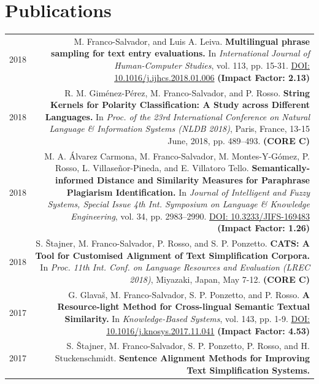 \documentclass[10pt]{article}
\begin{document}
\section*{Publications}
\begin{tabular}{L!{\VRule}R}
	2018 & M. Franco-Salvador, and Luis A. Leiva. \textbf{Multilingual phrase sampling for text entry evaluations.}
	In \emph{International Journal of Human-Computer Studies}, vol. 113, pp. 15-31. \href{https://doi.org/10.1016/j.ijhcs.2018.01.006}{DOI: 10.1016/j.ijhcs.2018.01.006} \textbf{(Impact Factor: 2.13)} \vspace{5pt}\\	
	2018& R. M. Gim{\'e}nez-P{\'e}rez, M. Franco-Salvador, and P. Rosso. \textbf{String Kernels for Polarity Classification: A Study across Different Languages.}
	In \emph{Proc. of the 23rd International Conference on Natural Language \& Information Systems (NLDB 2018)}, Paris, France, 13-15 June, 2018, pp. 489--493. \textbf{(CORE C)}\vspace{5pt}\\
	2018&M. A. {\'A}lvarez Carmona,  M. Franco-Salvador, M. Montes-Y-G{\'o}mez, P. Rosso, L. Villase{\~n}or-Pineda, and E. Villatoro Tello. \textbf{Semantically-informed Distance and Similarity Measures for Paraphrase Plagiarism Identification.}
	In \emph{Journal of Intelligent and Fuzzy Systems, Special Issue 4th Int. Symposium on Language \& Knowledge Engineering}, vol. 34, pp. 2983--2990. \href{https://doi.org/10.3233/JIFS-169483}{DOI: 10.3233/JIFS-169483} \textbf{(Impact Factor: 1.26)} \vspace{5pt}\\
	2018 & S. \v{S}tajner, M. Franco-Salvador, P. Rosso, and S. P. Ponzetto. \textbf{CATS: A Tool for Customised Alignment of Text Simplification Corpora.} In \emph{Proc. 11th Int. Conf. on Language Resources and Evaluation (LREC 2018)}, Miyazaki, Japan, May 7-12. \textbf{(CORE C)} \vspace{5pt}\\
	2017 & G. Glava{\v s}, M. Franco-Salvador, S. P. Ponzetto, and P. Rosso. \textbf{A Resource-light Method for Cross-lingual Semantic Textual Similarity.}
	In \emph{Knowledge-Based Systems}, vol. 143, pp. 1-9. \href{https://doi.org/10.1016/j.knosys.2017.11.041}{DOI: 10.1016/j.knosys.2017.11.041} \textbf{(Impact Factor: 4.53)} \vspace{5pt}\\		
	2017& S. \v{S}tajner, M. Franco-Salvador, S. P. Ponzetto, P. Rosso, and H. Stuckenschmidt. \textbf{Sentence Alignment Methods for Improving Text Simplification Systems.}

\end{tabular}
\end{document}
